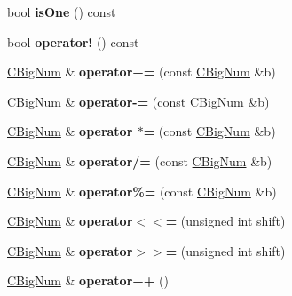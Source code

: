 \begin{DoxyCompactItemize}
bool {\bfseries is\+One} () const
\item 
\mbox{\label{class_c_big_num_a913c8446faf36d6cfebf5dc88a7fef9a}} 
bool {\bfseries operator!} () const
\item 
\mbox{\label{class_c_big_num_ac3da33626c8ab06d6a049b310c086dd5}} 
\mbox{\hyperlink{class_c_big_num}{C\+Big\+Num}} \& {\bfseries operator+=} (const \mbox{\hyperlink{class_c_big_num}{C\+Big\+Num}} \&b)
\item 
\mbox{\label{class_c_big_num_a4fe724fd22129eefc4e1f34d95505381}} 
\mbox{\hyperlink{class_c_big_num}{C\+Big\+Num}} \& {\bfseries operator-\/=} (const \mbox{\hyperlink{class_c_big_num}{C\+Big\+Num}} \&b)
\item 
\mbox{\label{class_c_big_num_adc516b532cc017ad5c33c1a2e027e743}} 
\mbox{\hyperlink{class_c_big_num}{C\+Big\+Num}} \& {\bfseries operator $\ast$=} (const \mbox{\hyperlink{class_c_big_num}{C\+Big\+Num}} \&b)
\item 
\mbox{\label{class_c_big_num_a213f7dc5a2d8212d3e7402a06ee5d5b9}} 
\mbox{\hyperlink{class_c_big_num}{C\+Big\+Num}} \& {\bfseries operator/=} (const \mbox{\hyperlink{class_c_big_num}{C\+Big\+Num}} \&b)
\item 
\mbox{\label{class_c_big_num_ac5bec8d967502c15e2dffc8600c933e6}} 
\mbox{\hyperlink{class_c_big_num}{C\+Big\+Num}} \& {\bfseries operator\%=} (const \mbox{\hyperlink{class_c_big_num}{C\+Big\+Num}} \&b)
\item 
\mbox{\label{class_c_big_num_a784951e3a24199fa6b994a951453d156}} 
\mbox{\hyperlink{class_c_big_num}{C\+Big\+Num}} \& {\bfseries operator$<$$<$=} (unsigned int shift)
\item 
\mbox{\label{class_c_big_num_a7d2759e104a02502891b185dfb704ad1}} 
\mbox{\hyperlink{class_c_big_num}{C\+Big\+Num}} \& {\bfseries operator$>$$>$=} (unsigned int shift)
\item 
\mbox{\label{class_c_big_num_ac9421f22614796d8520be7e6ade71ee8}} 
\mbox{\hyperlink{class_c_big_num}{C\+Big\+Num}} \& {\bfseries operator++} ()

\end{DoxyCompactItemize}
